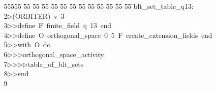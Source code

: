 %
%
\begin{tabbing}
55555 \= 55 \= 55 \= 55 \= 55 \= 55 \= 55 \= 55 \= 55 \= 55 \= 55 \= 55 \= 55 \= \>blt\_set\_table\_q13:\ \\[0pt]
2\>$\triangleright$\>(ORBITER)\ v\ 3\ \\[0pt]
3\>$\triangleright$\>$\triangleright$\>define\ F\ finite\_field\ q\ 13\ end\ \\[0pt]
4\>$\triangleright$\>$\triangleright$\>define\ O\ orthogonal\_space\ 0\ 5\ F\ create\_extension\_fields\ end\ \\[0pt]
5\>$\triangleright$\>$\triangleright$\>with\ O\ do\ \\[0pt]
6\>$\triangleright$\>$\triangleright$\>$\triangleright$\>orthogonal\_space\_activity\ \\[0pt]
7\>$\triangleright$\>$\triangleright$\>$\triangleright$\>$\triangleright$\>table\_of\_blt\_sets\ \\[0pt]
8\>$\triangleright$\>$\triangleright$\>end\\[0pt]
9\>\end{tabbing}
